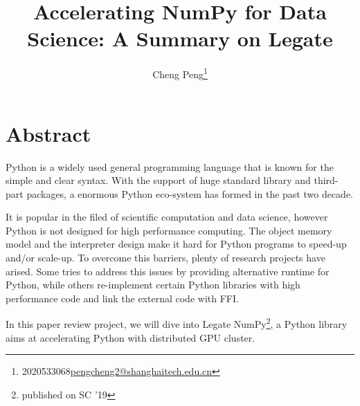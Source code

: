 \documentclass{article}
\newenvironment{newSecNoNP}[1]{
	\section{#1}
	\lhead{#1}
}{}
\begin{document}
\title{Accelerating NumPy for Data Science: A Summary on Legate}
\author{Cheng Peng\footnote{2020533068\quad \href{mailto:pengcheng2@shanghaitech.edu.cn}{pengcheng2@shanghaitech.edu.cn}}}
\maketitle
\tableofcontents
\newpage

\begin{newSecNoNP}{Abstract}
	Python is a widely used general programming language that is known for the simple and clear syntax.
	With the support of huge standard library and third-part packages, a enormous Python eco-system has formed in the past two decade.\par
	It is popular in the filed of scientific computation and data science, however Python is not designed for high performance computing.
	The object memory model and the interpreter design make it hard for Python programs to speed-up and/or scale-up.
	To overcome this barriers, plenty of research projects have arised.
	Some tries to address this issues by providing alternative runtime for Python,
	while others re-implement certain Python libraries with high performance code and link the external code with FFI.\par
	In this paper review project, we will dive into Legate NumPy\footnote{published on SC '19}\cite{Legate}, a Python library aims at accelerating Python with distributed GPU cluster.
\end{newSecNoNP}
\end{document}

